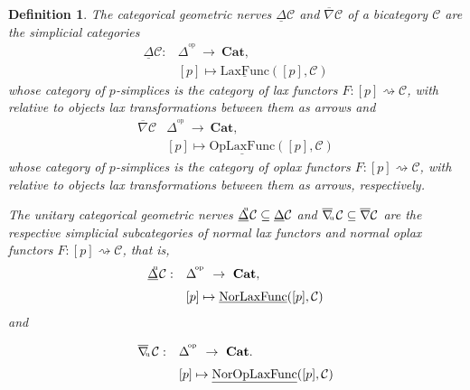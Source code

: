 \documentclass[]{amsart}
\newtheorem{definition}[theorem]{Definition}
\begin{document}
\begin{definition}\label{1.2.18'} The {\em categorical geometric nerves} ${\ensuremath{\underline{\Delta}}}{\ensuremath{\mathcal{C}}}$ and $\overline{\nabla}{\ensuremath{\mathcal{C}}}$ of a bicategory
${\ensuremath{\mathcal{C}}}$ are the simplicial categories
$$ \begin{array}{ll}{\ensuremath{\underline{\Delta}}}{\ensuremath{\mathcal{C}}}:&\Delta^{\!^{\mathrm{op}}}\ \to \ {\ensuremath{\mathbf{Cat}}},\\[6pt]
&[p]\mapsto {\ensuremath{\underline{\mathrm{LaxFunc}}}}([p],{\ensuremath{\mathcal{C}}})\end{array}$$ whose category of $p$-simplices is the category of  lax
functors $F:[p]\rightsquigarrow {\ensuremath{\mathcal{C}}}$, with relative to objects lax transformations between them as
arrows and
$$\begin{array}{ll}\overline{\nabla}{\ensuremath{\mathcal{C}}}&\Delta^{\!^{\mathrm{op}}}\ \to \ {\ensuremath{\mathbf{Cat}}},\\[6pt]
&[p]\mapsto {\ensuremath{\underline{\mathrm{OpLaxFunc}}}}([p],{\ensuremath{\mathcal{C}}})\end{array}$$ whose category of $p$-simplices is the category of  oplax
functors $F:[p]\rightsquigarrow {\ensuremath{\mathcal{C}}}$, with relative to objects lax transformations between them as
arrows, respectively.

The {\em unitary categorical geometric nerves}
 ${\ensuremath{\underline{\Delta}}}\hspace{-4pt}^{^\mathrm{u}}{\ensuremath{\mathcal{C}}} \subseteq {\ensuremath{\underline{\Delta}}}{\ensuremath{\mathcal{C}}}$ and
 $\overline{\nabla}\hspace{-2.5pt}_{^{_\mathrm{u}}}{\ensuremath{\mathcal{C}}}\subseteq \overline{\nabla}{\ensuremath{\mathcal{C}}}$ are the
 respective simplicial subcategories of normal lax functors and normal oplax functors $F:[p]\rightsquigarrow{\ensuremath{\mathcal{C}}}$, that is,
$$ \begin{array}{ll}{\ensuremath{\underline{\Delta}}}\hspace{-4pt}^{^\mathrm{u}}{\ensuremath{\mathcal{C}}}:&\Delta^{\!^{\mathrm{op}}}\ \to \ {\ensuremath{\mathbf{Cat}}},\\[6pt]
&[p]\mapsto {\ensuremath{\underline{\mathrm{NorLaxFunc}}}}([p],{\ensuremath{\mathcal{C}}})\end{array}$$ and

$$ \begin{array}{ll}\overline{\nabla}\hspace{-2.5pt}_{^{_\mathrm{u}}}{\ensuremath{\mathcal{C}}}:&\Delta^{\!^{\mathrm{op}}}\ \to \ {\ensuremath{\mathbf{Cat}}}.\\[6pt]
&[p]\mapsto {\ensuremath{\underline{\mathrm{NorOpLaxFunc}}}}([p],{\ensuremath{\mathcal{C}}})\end{array}$$


\end{definition}
\end{document}
